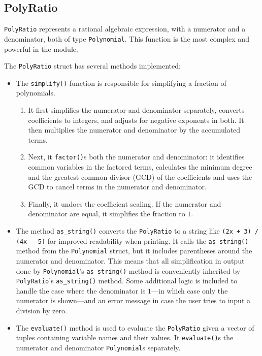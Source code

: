 \subsection{PolyRatio}\label{subsec:polyratio}

\verb|PolyRatio| represents a rational algebraic expression, with a numerator and a denominator, both of type \verb|Polynomial|. This function is the most complex and powerful in the module.

The \verb|PolyRatio| struct has several methods implemented:

\begin{itemize}
    \item The \verb|simplify()| function is responsible for simplifying a fraction of polynomials.
    
    \begin{enumerate}
        \item It first simplifies the numerator and denominator separately, converts coefficients to integers, and adjusts for negative exponents in both. It then multiplies the numerator and denominator by the accumulated terms.
        \item Next, it \verb|factor()|s both the numerator and denominator: it identifies common variables in the factored terms, calculates the minimum degree and the greatest common divisor (GCD) of the coefficients and uses the GCD to cancel terms in the numerator and denominator.
        \item Finally, it undoes the coefficient scaling. If the numerator and denominator are equal, it simplifies the fraction to $1$.
    \end{enumerate}

    \item The method \verb|as_string()| converts the \verb|PolyRatio| to a string like \texttt{(2x + 3) / (4x - 5)} for improved readability when printing. It calls the \verb|as_string()| method from the \verb|Polynomial| struct, but it includes parentheses around the numerator and denominator. This means that all simplification in output done by \verb|Polynomial|'s \verb|as_string()| method is conveniently inherited by \verb|PolyRatio|'s \verb|as_string()| method. Some additional logic is included to handle the case where the denominator is $1$---in which case only the numerator is shown---and an error message in case the user tries to input a division by zero.
    \item The \verb|evaluate()| method is used to evaluate the \verb|PolyRatio| given a vector of tuples containing variable names and their values. It \verb|evaluate()|s the numerator and denominator \verb|Polynomial|s separately.

\end{itemize}

